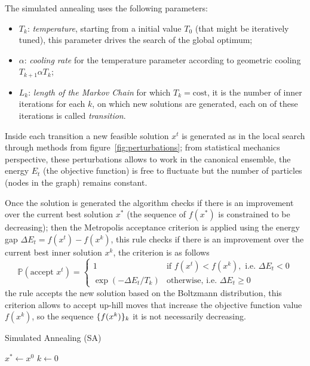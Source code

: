 The simulated annealing uses the following parameters:
\begin{itemize}
	\item $T_k$: \emph{temperature}, starting from a initial value $T_0$ (that might be iteratively tuned), this parameter drives the search of the global optimum;
	\item $\alpha$: \emph{cooling rate} for the temperature parameter according to geometric cooling $T_{k+1}\alpha T_k$;
	\item $L_k$: \emph{length of the Markov Chain} for which $T_k=\text{cost}$, it is the number of inner iterations for each $k$, on which new solutions are generated, each on of these iterations is called \emph{transition}.
\end{itemize}

Inside each transition a new feasible solution $x^t$ is generated as in the local search through methods from figure~\vref{fig:perturbations}; from statistical mechanics perspective, these perturbations allows to work in the canonical ensemble, the energy $E_t$ (the objective function) is free to fluctuate but the number of particles (nodes in the graph) remains constant.

Once the solution is generated the algorithm checks if there is an improvement over the current best solution $x^\ast$ (the sequence of $f(x^\ast)$ is constrained to be decreasing); then the Metropolis acceptance criterion is applied using the energy gap $\Delta E_t=f(x^t)-f(x^k)$, this rule checks if there is an improvement over the current best inner solution $x^k$, the criterion is as follows
\[
\mathbb{P}(\text{accept $x^t$})=
\begin{cases}
	1 & \text{if $f(x^t)<f(x^k), \text{ i.e. } \Delta E_t<0$} \\
	\exp(-\Delta E_t/T_k) & \text{otherwise, i.e. $\Delta E_t\geq0$}
\end{cases}
\]
the rule accepts the new solution based on the Boltzmann distribution, this criterion allows to accept up-hill moves that increase the objective function value $f(x^k)$, so the sequence $\{f(x^k)\}_k$ it is not necessarily decreasing.

\begin{algorithm}\caption{Simulated Annealing (SA)}\label{alg:sim-ann}
	$x^\ast\gets x^0$\;
	$k\gets0$\;
\end{algorithm}

